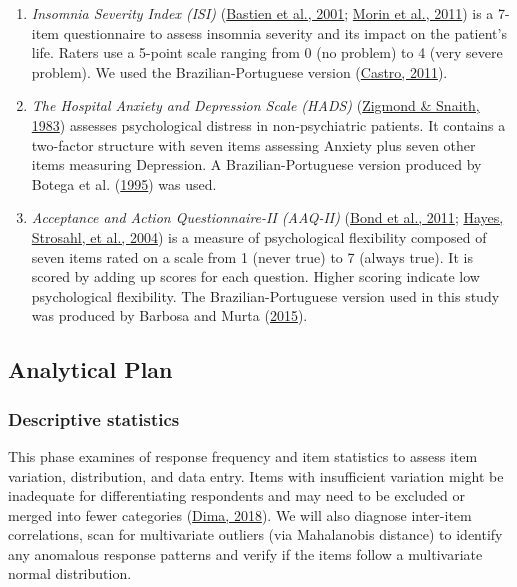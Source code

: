 \documentclass[
  ,doc,11pt, twoside,floatsintext]{apa6}
\begin{document}
\begin{enumerate}
\def\labelenumi{\arabic{enumi}.}
\item
  \emph{Insomnia Severity Index (ISI)} (\protect\hyperlink{ref-bastien2001}{Bastien et al., 2001}; \protect\hyperlink{ref-morin2011a}{Morin et al., 2011}) is a 7-item questionnaire to assess insomnia severity and its impact on the patient's life. Raters use a 5-point scale ranging from 0 (no problem) to 4 (very severe problem). We used the Brazilian-Portuguese version (\protect\hyperlink{ref-castro}{Castro, 2011}).
\item
  \emph{The Hospital Anxiety and Depression Scale (HADS)} (\protect\hyperlink{ref-zigmond1983hospital}{Zigmond \& Snaith, 1983}) assesses psychological distress in non-psychiatric patients. It contains a two-factor structure with seven items assessing Anxiety plus seven other items measuring Depression. A Brazilian-Portuguese version produced by Botega et al. (\protect\hyperlink{ref-botega1995transtornos}{1995}) was used.
\item
  \emph{Acceptance and Action Questionnaire-II (AAQ-II)} (\protect\hyperlink{ref-bond2011preliminary}{Bond et al., 2011}; \protect\hyperlink{ref-hayes2004measuring}{Hayes, Strosahl, et al., 2004}) is a measure of psychological flexibility composed of seven items rated on a scale from 1 (never true) to 7 (always true). It is scored by adding up scores for each question. Higher scoring indicate low psychological flexibility. The Brazilian-Portuguese version used in this study was produced by Barbosa and Murta (\protect\hyperlink{ref-barbosa2015propriedades}{2015}).
\end{enumerate}

\hypertarget{analytical-plan}{%
\subsection{Analytical Plan}\label{analytical-plan}}

\hypertarget{descriptive-statistics}{%
\subsubsection{Descriptive statistics}\label{descriptive-statistics}}

This phase examines of response frequency and item statistics to assess item variation, distribution, and data entry. Items with insufficient variation might be inadequate for differentiating respondents and may need to be excluded or merged into fewer categories (\protect\hyperlink{ref-dima2018}{Dima, 2018}). We will also diagnose inter-item correlations, scan for multivariate outliers (via Mahalanobis distance) to identify any anomalous response patterns and verify if the items follow a multivariate normal distribution.
\end{document}
